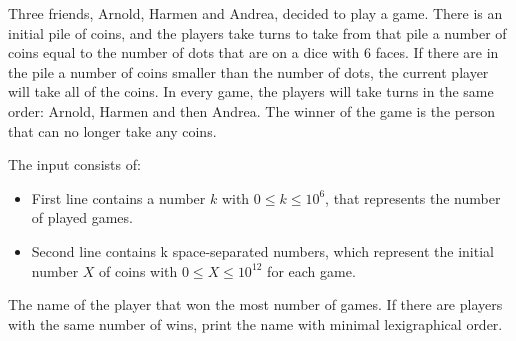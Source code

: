 \problemname{\problemyamlname}


\newcommand{\maxa}{123456789}

Three friends, Arnold, Harmen and Andrea, decided to play a game. There is an initial pile of coins, and the players take turns to take from that pile a number of coins equal to the number of dots that are on a dice with 6 faces. If there are in the pile a number of coins smaller than the number of dots, the current player will take all of the coins. In every game, the players will take turns in the same order: Arnold, Harmen and then Andrea. The winner of the game is the person that can no longer take any coins.

\begin{Input}
    The input consists of:
    \begin{itemize}
        \item First line contains a number $k$ with $0 \leq k \leq 10^6$, that represents the number of played games.
        \item Second line contains k space-separated numbers, which represent the initial number $X$ of coins with $0 \leq X \leq 10^{12}$ for each game.
    \end{itemize}
\end{Input}

\begin{Output}
    The name of the player that won the most number of games. If there are players with the same number of wins, print the name with minimal lexigraphical order.
\end{Output}
